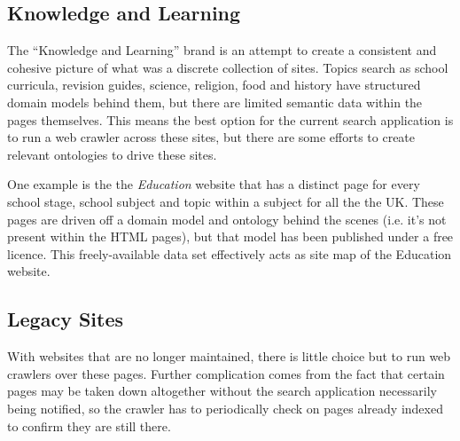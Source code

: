 \subsection{Knowledge and Learning}

The ``Knowledge and Learning'' brand is an attempt to create
a consistent and cohesive picture of what was a discrete
collection of sites. Topics search as school curricula, revision
guides, science, religion, food and history have structured
domain models behind them, but there are limited semantic data
within the pages themselves. This means the best option for
the current search application is to run a web crawler across
these sites, but there are some efforts to create relevant
ontologies to drive these sites.

One example is the the \emph{Education} website that has
a distinct page for every school stage, school subject
and topic within a subject for all the the UK. These pages
are driven off a domain model and ontology\cite{bbc2013curriculum}
behind the scenes
(i.e. it's not present within the HTML pages), but that
model has been published under a free licence.
\cite{bbc2014curriculum} This freely-available data set
effectively acts as site map of the Education website.

\subsection{Legacy Sites}

With websites that are no longer maintained, there is little choice
but to run web crawlers over these pages. Further complication
comes from the fact that certain pages may be taken down
altogether without the search application necessarily being
notified, so the crawler has to periodically check on
pages already indexed to confirm they are still there.
